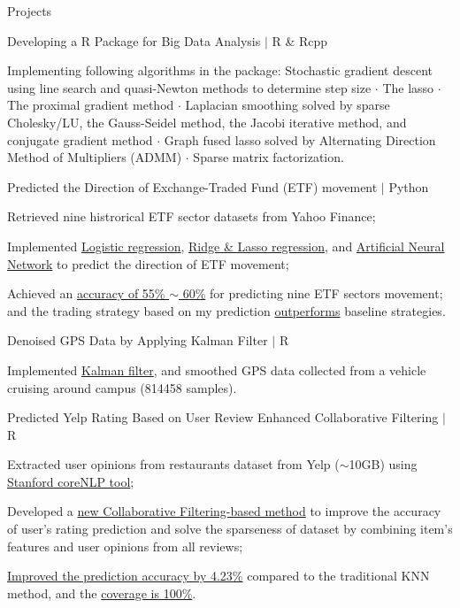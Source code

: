 \documentclass{my_resume} %
\begin{document}
\begin{rSection}{Projects}

  \begin{rSubsection}{Developing a R Package for Big Data Analysis $|$ R \&
    Rcpp}{}{}
  \item Implementing following algorithms in the package: Stochastic gradient
    descent using line search and quasi-Newton methods to determine step size
    {$\cdot$} The lasso {$\cdot$} The proximal gradient method {$\cdot$}
    Laplacian smoothing solved by sparse Cholesky/LU, the Gauss-Seidel method,
    the Jacobi iterative method, and conjugate gradient method {$\cdot$} Graph
    fused lasso solved by Alternating Direction Method of Multipliers (ADMM)
    {$\cdot$} Sparse matrix factorization.
  \end{rSubsection}

  \begin{rSubsection}{Predicted the Direction of Exchange-Traded Fund
    (ETF) movement $|$ Python}{}{}
  \item Retrieved nine histrorical ETF sector datasets from Yahoo Finance;
  \item Implemented \underline{Logistic regression}, \underline{Ridge \& Lasso
    regression}, and \underline{Artificial Neural Network} to predict the
    direction of ETF movement;
  \item Achieved an \underline{accuracy of 55\% $\sim$ 60\%} for predicting
    nine ETF sectors movement; and the trading strategy based on my prediction
    \underline{outperforms} baseline strategies.
  \end{rSubsection}

  \begin{rSubsection}{Denoised GPS Data by Applying Kalman Filter $|$ R}{}{}
  \item Implemented \underline{Kalman filter}, and smoothed GPS data collected from
    a vehicle cruising around campus (814458 samples).
  \end{rSubsection}

  \begin{rSubsection}{Predicted Yelp Rating Based on User Review Enhanced
    Collaborative Filtering $|$ R}{}{}
  \item Extracted user opinions from restaurants dataset from Yelp ($\sim$10GB)
    using \underline{Stanford coreNLP tool};
  \item Developed a \underline{new Collaborative Filtering-based method} to
    improve the accuracy of user's rating prediction and solve the sparseness
    of dataset by combining item's features and user opinions from all reviews;
  \item \underline{Improved the prediction accuracy by 4.23\%} compared to the
    traditional KNN method, and the \underline{coverage is 100\%}.
  \end{rSubsection}


\end{rSection}
\end{document}
